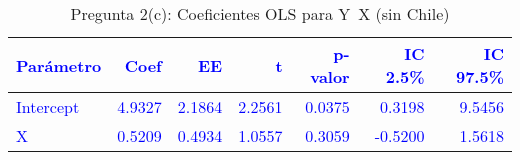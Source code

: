 \begin{table}[H]
\centering
\caption{Pregunta 2(c): Coeficientes OLS para Y~X (sin Chile)}
\label{tab:q2c_coefs}
\begin{tabular}{lrrrrrr}
\rowcolor{blue!10}
\toprule
\rowcolor{blue!20}
\textcolor{blue}{\textbf{Parámetro}} & \textcolor{blue}{\textbf{Coef}} & \textcolor{blue}{\textbf{EE}} & \textcolor{blue}{\textbf{t}} & \textcolor{blue}{\textbf{p-valor}} & \textcolor{blue}{\textbf{IC 2.5\%}} & \textcolor{blue}{\textbf{IC 97.5\%}} \\
\midrule
\rowcolor{blue!10}
\textcolor{blue}{Intercept} & \textcolor{blue}{4.9327} & \textcolor{blue}{2.1864} & \textcolor{blue}{2.2561} & \textcolor{blue}{0.0375} & \textcolor{blue}{0.3198} & \textcolor{blue}{9.5456} \\
\rowcolor{blue!10}
\textcolor{blue}{X} & \textcolor{blue}{0.5209} & \textcolor{blue}{0.4934} & \textcolor{blue}{1.0557} & \textcolor{blue}{0.3059} & \textcolor{blue}{-0.5200} & \textcolor{blue}{1.5618} \\
\bottomrule
\end{tabular}
\end{table}
